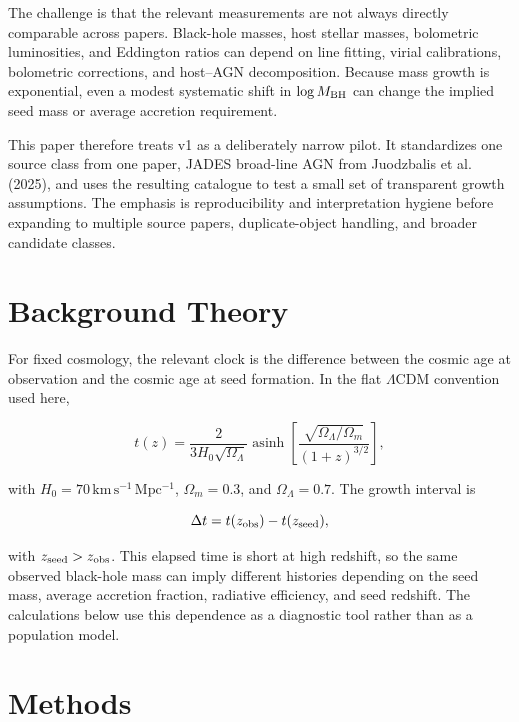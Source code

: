 \documentclass[letterpaper,12pt]{article}
\begin{document}
The challenge is that the relevant measurements are not always directly comparable across papers. Black-hole masses, host stellar masses, bolometric luminosities, and Eddington ratios can depend on line fitting, virial calibrations, bolometric corrections, and host--AGN decomposition. Because mass growth is exponential, even a modest systematic shift in $\log M_{\rm BH}$ can change the implied seed mass or average accretion requirement.

This paper therefore treats v1 as a deliberately narrow pilot. It standardizes one source class from one paper, JADES broad-line AGN from Juodzbalis et al. (2025), and uses the resulting catalogue to test a small set of transparent growth assumptions. The emphasis is reproducibility and interpretation hygiene before expanding to multiple source papers, duplicate-object handling, and broader candidate classes.

\section{Background Theory}

For fixed cosmology, the relevant clock is the difference between the cosmic age at observation and the cosmic age at seed formation. In the flat $\Lambda$CDM convention used here,

\begin{equation}
t(z) =
\frac{2}{3H_0\sqrt{\Omega_{\Lambda}}}
\operatorname{asinh}
\left[
\frac{\sqrt{\Omega_{\Lambda}/\Omega_m}}{(1+z)^{3/2}}
\right],
\label{eq:cosmic_time}
\end{equation}

with $H_0=70\,\mathrm{km\,s^{-1}\,Mpc^{-1}}$, $\Omega_m=0.3$, and $\Omega_\Lambda=0.7$. The growth interval is

\begin{equation}
\Delta t = t(z_{\rm obs}) - t(z_{\rm seed}),
\label{eq:delta_t}
\end{equation}

with $z_{\rm seed}>z_{\rm obs}$. This elapsed time is short at high redshift, so the same observed black-hole mass can imply different histories depending on the seed mass, average accretion fraction, radiative efficiency, and seed redshift. The calculations below use this dependence as a diagnostic tool rather than as a population model.

\section{Methods}
\end{document}

